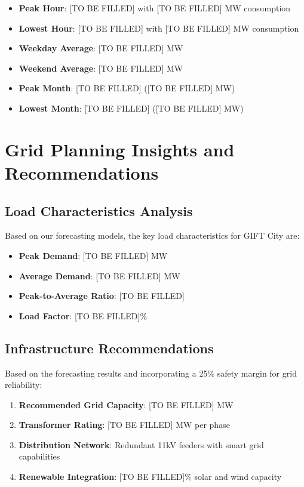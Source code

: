 \documentclass[12pt,a4paper]{article}
\begin{document}
\begin{itemize}
    \item \textbf{Peak Hour}: [TO BE FILLED] with [TO BE FILLED] MW consumption
    \item \textbf{Lowest Hour}: [TO BE FILLED] with [TO BE FILLED] MW consumption
    \item \textbf{Weekday Average}: [TO BE FILLED] MW
    \item \textbf{Weekend Average}: [TO BE FILLED] MW
    \item \textbf{Peak Month}: [TO BE FILLED] ([TO BE FILLED] MW)
    \item \textbf{Lowest Month}: [TO BE FILLED] ([TO BE FILLED] MW)
\end{itemize}

\section{Grid Planning Insights and Recommendations}

\subsection{Load Characteristics Analysis}
Based on our forecasting models, the key load characteristics for GIFT City are:

\begin{itemize}
    \item \textbf{Peak Demand}: [TO BE FILLED] MW
    \item \textbf{Average Demand}: [TO BE FILLED] MW
    \item \textbf{Peak-to-Average Ratio}: [TO BE FILLED]
    \item \textbf{Load Factor}: [TO BE FILLED]\%
\end{itemize}

\subsection{Infrastructure Recommendations}
Based on the forecasting results and incorporating a 25\% safety margin for grid reliability:

\begin{enumerate}
    \item \textbf{Recommended Grid Capacity}: [TO BE FILLED] MW
    \item \textbf{Transformer Rating}: [TO BE FILLED] MW per phase
    \item \textbf{Distribution Network}: Redundant 11kV feeders with smart grid capabilities
    \item \textbf{Renewable Integration}: [TO BE FILLED]\% solar and wind capacity
\end{enumerate}
\end{document}
